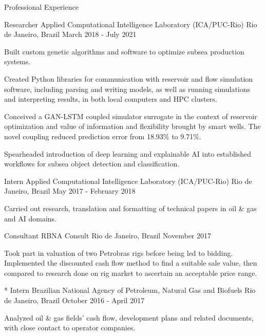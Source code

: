 \begin{cvcontentsection}{Professional Experience}
\begin{cvjob}
    {Researcher}
    {Applied Computational Intelligence Laboratory (ICA/PUC-Rio)}
    {Rio de Janeiro, Brazil}
    {March 2018 - July 2021}
    \item Built custom genetic algorithms and software to optimize subsea production systems.
    \item Created Python libraries for communication with reservoir and flow simulation software, including parsing and writing models, as well as running simulations and interpreting results, in both local computers and HPC clusters.
    \item Conceived a GAN-LSTM coupled simulator surrogate in the context of reservoir optimization and value of information and flexibility brought by smart wells.
    The novel coupling reduced prediction error from 18.93\% to 9.71\%.
    \item Spearheaded introduction of deep learning and explainable AI into established workflows for subsea object detection and classification.
\end{cvjob}

\begin{cvjob}
    {Intern}
    {Applied Computational Intelligence Laboratory (ICA/PUC-Rio)}
    {Rio de Janeiro, Brazil}
    {May 2017 - February 2018}
    \item Carried out research, translation and formatting of technical papers in oil \& gas and AI domains.
\end{cvjob}

\begin{cvjob}
    {Consultant}
    {RBNA Consult}
    {Rio de Janeiro, Brazil}
    {November 2017}
    \item Took part in valuation of two Petrobras rigs before being led to bidding.
    Implemented the discounted cash flow method to find a suitable sale value, then compared to research done on rig market to ascertain an acceptable price range.

\end{cvjob}

\begin{cvjob}*
    {Intern}
    {Brazilian National Agency of Petroleum, Natural Gas and Biofuels}
    {Rio de Janeiro, Brazil}
    {October 2016 - April 2017}
    \item Analyzed oil \& gas fields' cash flow, development plans and related documents, with close contact to operator companies.
\end{cvjob}

\end{cvcontentsection}
